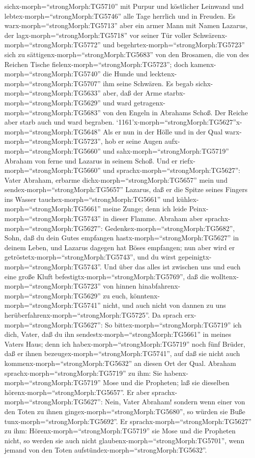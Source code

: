 sichx-morph=``strongMorph:TG5710'' mit Purpur und köstlicher Leinwand
und lebtex-morph=``strongMorph:TG5746'' alle Tage herrlich und in
Freuden.  Es warx-morph=``strongMorph:TG5713'' aber ein
armer Mann mit Namen Lazarus, der lagx-morph=``strongMorph:TG5718'' vor
seiner Tür voller Schwärenx-morph=``strongMorph:TG5772'' 
und begehrtex-morph=``strongMorph:TG5723'' sich zu
sättigenx-morph=``strongMorph:TG5683'' von den Brosamen, die von des
Reichen Tische fielenx-morph=``strongMorph:TG5723''; doch
kamenx-morph=``strongMorph:TG5740'' die Hunde und
lecktenx-morph=``strongMorph:TG5707'' ihm seine Schwären. 
Es begab sichx-morph=``strongMorph:TG5633'' aber, daß der Arme
starbx-morph=``strongMorph:TG5629'' und ward
getragenx-morph=``strongMorph:TG5683'' von den Engeln in Abrahams Schoß.
Der Reiche aber starb auch und ward begraben. 
`1161'x-morph=``strongMorph:TG5627''x-morph=``strongMorph:TG5648'' Als
er nun in der Hölle und in der Qual warx-morph=``strongMorph:TG5723'',
hob er seine Augen aufx-morph=``strongMorph:TG5660'' und
sahx-morph=``strongMorph:TG5719'' Abraham von ferne und Lazarus in
seinem Schoß.  Und er riefx-morph=``strongMorph:TG5660''
und sprachx-morph=``strongMorph:TG5627'': Vater Abraham, erbarme
dichx-morph=``strongMorph:TG5657'' mein und
sendex-morph=``strongMorph:TG5657'' Lazarus, daß er die Spitze seines
Fingers ins Wasser tauchex-morph=``strongMorph:TG5661'' und
kühlex-morph=``strongMorph:TG5661'' meine Zunge; denn ich leide
Peinx-morph=``strongMorph:TG5743'' in dieser Flamme. 
Abraham aber sprachx-morph=``strongMorph:TG5627'':
Gedenkex-morph=``strongMorph:TG5682'', Sohn, daß du dein Gutes empfangen
hastx-morph=``strongMorph:TG5627'' in deinem Leben, und Lazarus dagegen
hat Böses empfangen; nun aber wird er
getröstetx-morph=``strongMorph:TG5743'', und du wirst
gepeinigtx-morph=``strongMorph:TG5743''.  Und über das
alles ist zwischen uns und euch eine große Kluft
befestigtx-morph=``strongMorph:TG5769'', daß die
wolltenx-morph=``strongMorph:TG5723'' von hinnen
hinabfahrenx-morph=``strongMorph:TG5629'' zu euch,
könntenx-morph=``strongMorph:TG5741'' nicht, und auch nicht von dannen
zu uns herüberfahrenx-morph=``strongMorph:TG5725''.  Da
sprach erx-morph=``strongMorph:TG5627'': So
bittex-morph=``strongMorph:TG5719'' ich dich, Vater, daß du ihn
sendestx-morph=``strongMorph:TG5661'' in meines Vaters Haus;
 denn ich habex-morph=``strongMorph:TG5719'' noch fünf
Brüder, daß er ihnen bezeugex-morph=``strongMorph:TG5741'', auf daß sie
nicht auch kommenx-morph=``strongMorph:TG5632'' an diesen Ort der Qual.
 Abraham sprachx-morph=``strongMorph:TG5719'' zu ihm: Sie
habenx-morph=``strongMorph:TG5719'' Mose und die Propheten; laß sie
dieselben hörenx-morph=``strongMorph:TG5657''.  Er aber
sprachx-morph=``strongMorph:TG5627'': Nein, Vater Abraham! sondern wenn
einer von den Toten zu ihnen gingex-morph=``strongMorph:TG5680'', so
würden sie Buße tunx-morph=``strongMorph:TG5692''.  Er
sprachx-morph=``strongMorph:TG5627'' zu ihm:
Hörenx-morph=``strongMorph:TG5719'' sie Mose und die Propheten nicht, so
werden sie auch nicht glaubenx-morph=``strongMorph:TG5701'', wenn jemand
von den Toten aufstündex-morph=``strongMorph:TG5632''.

